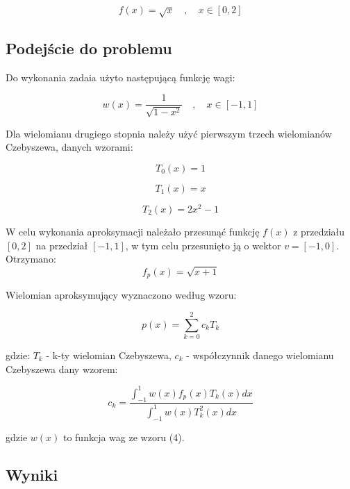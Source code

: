 \documentclass{article}
\begin{document}
	\begin{equation}
		f(x) = \sqrt{x} \quad , \quad x \in [0, 2]
	\end{equation}
	
	\subsection*{Podejście do problemu}	
	
	Do wykonania zadaia użyto następującą funkcję wagi:
	
	\begin{equation}
		w(x) = \frac{1}{\sqrt{1-x^2}} \quad , \quad x \in [-1, 1]
	\end{equation}
	
	Dla wielomianu drugiego stopnia należy użyć pierwszym trzech wielomianów Czebyszewa, danych wzorami:
	
	\begin{equation}
		T_0(x) = 1
	\end{equation}
	
	\begin{equation}
		T_1(x) = x
	\end{equation}
	
	\begin{equation}
		T_2(x) = 2x^2-1
	\end{equation}
	
	W celu wykonania aproksymacji należało przesunąć funkcję $f(x)$ z przedziału $[0,2]$ na przedział $[-1,1]$, w tym celu przesunięto ją o wektor $v = [-1,0]$. Otrzymano:
	\begin{equation}
		f_p(x) = \sqrt{x+1}
	\end{equation}
	
	Wielomian aproksymujący wyznaczono według wzoru:
	
	\begin{equation}
		p(x) = \sum^2_{k=0} c_k T_k
	\end{equation}
	
	gdzie: $T_k$ - k-ty wielomian Czebyszewa, $c_k$ - współczynnik danego wielomianu Czebyszewa dany wzorem:
	
	\begin{equation}
		c_k = \frac{\int^1_{-1} w(x)f_p(x)T_k(x) dx}{\int^1_{-1} w(x)T_k^2(x) dx}
	\end{equation}
	
	gdzie $w(x)$ to funkcja wag ze wzoru (4). 
	
	\subsection*{Wyniki}
	
\end{document}
